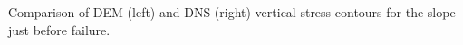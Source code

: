 \label{fig:S22DNS} Comparison of DEM (left) and DNS (right) vertical stress contours for the slope just before failure.  
